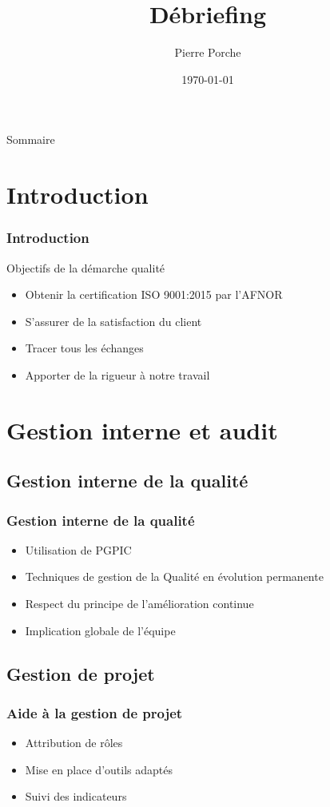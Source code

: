 \documentclass[compress,xcolor=dvipsnames]{beamer}
\title{Débriefing \RQ}
\date{\today}
\author{Pierre Porche}
\institute{\insa}
\begin{document}
\begin{frame}[plain]
	\titlepage
\end{frame}

\begin{frame}{Sommaire}
	\tableofcontents[hideallsubsections]
\end{frame}

\section{Introduction}
\begin{frame}
\frametitle{Introduction}
\begin{block}{Objectifs de la démarche qualité}
\begin{itemize}
\item Obtenir la certification ISO 9001:2015 par l’AFNOR
\item S’assurer de la satisfaction du client
\item Tracer tous les échanges
\item Apporter de la rigueur à notre travail
\end{itemize}
\end{block}
\end{frame}


\section{Gestion interne et audit}
\subsection{Gestion interne de la qualité}
\begin{frame}
\frametitle{Gestion interne de la qualité}
\begin{itemize}
\item Utilisation de PGPIC
\item Techniques de gestion de la Qualité en évolution permanente
\item Respect du principe de l'amélioration continue
\item Implication globale de l'équipe
\end{itemize}
\end{frame}

\subsection{Gestion de projet}
\begin{frame}
\frametitle{Aide à la gestion de projet}
\begin{itemize}
\item Attribution de rôles
\item Mise en place d'outils adaptés
\item Suivi des indicateurs
\end{itemize}
\end{frame}
\end{document}
